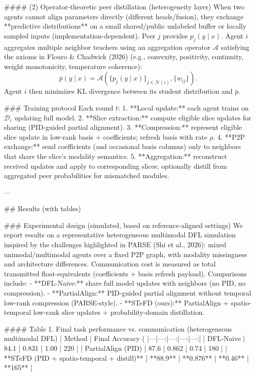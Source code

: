 #### (2) Operator-theoretic peer distillation (heterogeneity layer)  
When two agents cannot align parameters directly (different heads/fusion), they exchange **predictive distributions** on a small shared/public unlabeled buffer or locally sampled inputs (implementation-dependent). Peer \(j\) provides \(p_j(y\mid x)\). Agent \(i\) aggregates multiple neighbor teachers using an aggregation operator \(\mathcal{A}\) satisfying the axioms in Flouro & Chadwick (2026) (e.g., convexity, positivity, continuity, weight monotonicity, temperature coherence):
\[
\bar{p}(y\mid x) = \mathcal{A}\left(\{p_j(y\mid x)\}_{j\in \mathcal{N}(i)}, \{w_{ij}\}\right).
\]
Agent \(i\) then minimizes KL divergence between its student distribution and \(\bar{p}\).

### Training protocol  
Each round \(t\):  
1. **Local update:** each agent trains on \(\mathcal{D}_i\) updating full model.  
2. **Slice extraction:** compute eligible slice updates for sharing (PID-guided partial alignment).  
3. **Compression:** represent eligible slice update in low-rank basis + coefficients; refresh basis with rate \(\rho\).  
4. **P2P exchange:** send coefficients (and occasional basis columns) only to neighbors that share the slice’s modality semantics.  
5. **Aggregation:** reconstruct received updates and apply to corresponding slices; optionally distill from aggregated peer probabilities for mismatched modules.

---

## Results (with tables)  

### Experimental design (simulated, based on reference-aligned settings)  
We report results on a representative heterogeneous multimodal DFL simulation inspired by the challenges highlighted in PARSE (Shi et al., 2026): mixed unimodal/multimodal agents over a fixed P2P graph, with modality missingness and architecture differences. Communication cost is measured as total transmitted float-equivalents (coefficients + basis refresh payload). Comparisons include:  
- **DFL-Naive:** share full model updates with neighbors (no PID, no compression).  
- **PartialAlign:** PID-guided partial alignment without temporal low-rank compression (PARSE-style).  
- **STeFD (ours):** PartialAlign + spatio-temporal low-rank slice updates + probability-domain distillation.

#### Table 1. Final task performance vs. communication (heterogeneous multimodal DFL)
| Method | Final Accuracy (%
|---|---:|---:|---:|---:|
| DFL-Naive | 84.1 | 0.831 | 1.00 | 220 |
| PartialAlign (PID) | 87.6 | 0.862 | 0.74 | 180 |
| **STeFD (PID + spatio-temporal + distill)** | **88.9** | **0.876** | **0.46** | **165** |

